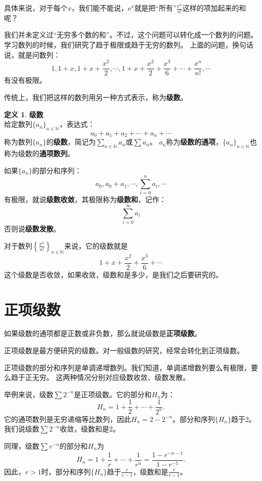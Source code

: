 \documentclass[12pt,UTF8]{ctexbook}
\theoremstyle{definition}
\newtheorem{df}{定义}[section]
\theoremstyle{plain}
\begin{document}
具体来说，对于每个$x$，我们能不能说，$\mathrm{e}^x$就是把“所有”$\frac{x^n}{n!}$这样的项加起来的和呢？

我们并未定义过“无穷多个数的和”。不过，这个问题可以转化成一个数列的问题。
学习数列的时候，我们研究了趋于极限或趋于无穷的数列。
上面的问题，换句话说，就是问数列：
$$ 1, 1+x, 1+x + \frac{x^2}{2}, \cdots , 1 + x + \frac{x^2}{2} + \frac{x^3}{6} + \cdots + \frac{x^n}{n!}, \cdots $$
有没有极限。

传统上，我们把这样的数列用另一种方式表示，称为\textbf{级数}。

\begin{df}{\textbf{级数}}
    \mbox{} \\
    给定数列$\{a_n\}_{n\in\mathbb{N}}$，表达式：
    $$ a_0 + a_1 + a_2 + \cdots + a_n + \cdots $$
    称为数列$\{a_n\}$的\textbf{级数}，简记为$\sum_{n\in\mathbb{N}} a_n$或$\sum a_n$。
    $a_n$称为\textbf{级数的通项}，$\{a_n\}_{n\in\mathbb{N}}$也称为级数的\textbf{通项数列}。
    
    如果$\{a_n\}$的部分和序列：
    $$ a_0, a_0 + a_1, \cdots , \sum_{i=0}^n a_i, \cdots $$
    有极限，就说\textbf{级数收敛}，其极限称为\textbf{级数和}，记作：
    $$ \sum_{i=0}^\infty a_i $$
    否则说\textbf{级数发散}。
    
\end{df}

对于数列$\left\{\frac{x^n}{n!}\right\}_{n\in\mathbb{N}}$来说，它的级数就是
$$ 1 + x + \frac{x^2}{2} + \frac{x^3}{6} + \cdots $$
这个级数是否收敛，如果收敛，级数和是多少，是我们之后要研究的。

\section{正项级数}

如果级数的通项都是正数或非负数，那么就说级数是\textbf{正项级数}。

正项级数是最方便研究的级数。对一般级数的研究，经常会转化到正项级数。

正项级数的部分和序列是单调递增数列。我们知道，单调递增数列要么有极限，要么趋于正无穷。
这两种情况分别对应级数收敛、级数发散。

举例来说，级数$\sum 2^{-n}$是正项级数。它的部分和$H_n$为：
$$ H_n = 1 + \frac{1}{2} + \cdots + \frac{1}{2^n}.$$
它的通项数列是无穷递缩等比数列，因此$H_n = 2 - 2^{-n}$。部分和序列$\{H_n\}$趋于$2$。
我们说级数$\sum 2^{-n}$收敛，级数和是$2$。

同理，级数$\sum r^{-n}$的部分和$H_n$为
$$ H_n = 1 + \frac{1}{r} + \cdots + \frac{1}{r^n} = \frac{1 - r^{-n-1}}{1 - r^{-1}}.$$
因此，$r>1$时，部分和序列$\{H_n\}$趋于$\frac{r}{r - 1}$，级数和是$\frac{r}{r - 1}$。
\end{document}
